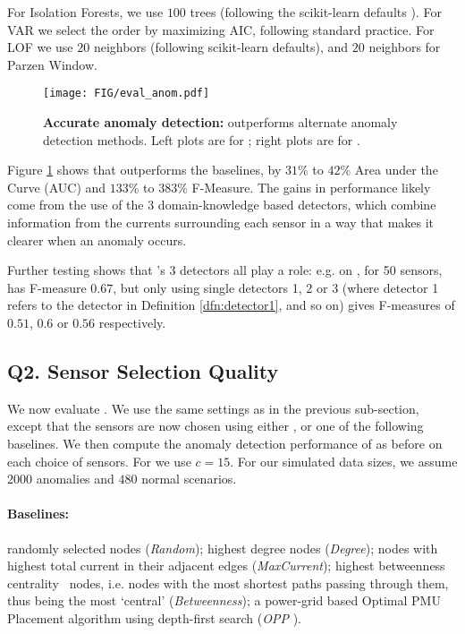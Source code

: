 For Isolation Forests, we use $100$ trees (following the scikit-learn defaults \cite{scikit-learn}). For VAR we select the order by maximizing AIC, following standard practice. For LOF we use $20$ neighbors (following scikit-learn defaults), and $20$ neighbors for Parzen Window.

\begin{figure}[h!]
    \centering
    \texttt{[image: FIG/eval\_anom.pdf]}
    \caption{\label{fig:eval_anom}\textbf{Accurate anomaly detection:} \methodD outperforms alternate anomaly detection methods. Left plots are for \datasmall; right plots are for \datalarge. }
\end{figure}

Figure \ref{fig:eval_anom} shows that \methodD outperforms the baselines, by $31\%$ to $42\%$ Area under the Curve (AUC) and $133\%$ to $383\%$ F-Measure. The gains in performance likely come from the use of the 3 domain-knowledge based detectors, which combine information from the currents surrounding each sensor in a way that makes it clearer when an anomaly occurs.

Further testing shows that \methodD's 3 detectors all play a role: e.g. on \datasmall, for 50 sensors, \methodD has F-measure $0.67$, but only using single detectors 1, 2 or 3 (where detector 1 refers to the detector in Definition \ref{dfn:detector1}, and so on) gives F-measures of $0.51$, $0.6$ or $0.56$ respectively. 

\subsection{Q2. Sensor Selection Quality}
We now evaluate \method. We use the same settings as in the previous sub-section, except that the sensors are now chosen using either \method, or one of the following baselines. We then compute the anomaly detection performance of \methodD as before on each choice of sensors. For \method we use $c=15$. For our simulated data sizes, we assume $2000$ anomalies and $480$ normal scenarios.

\paragraph{\bf Baselines:} randomly selected nodes ({\it Random}); highest degree nodes ({\it Degree}); nodes with highest total current in their adjacent edges ({\it MaxCurrent}); highest betweenness centrality~\cite{freeman1978centrality} nodes, i.e. nodes with the most shortest paths passing through them, thus being the most `central' ({\it Betweenness}); a power-grid based Optimal PMU Placement algorithm using depth-first search ({\it OPP} \cite{baldwin1993power}).

